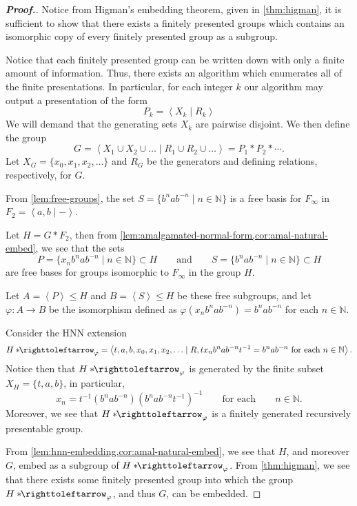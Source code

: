 \documentclass[11pt,a4paper,reqno]{amsart}
\theoremstyle{plain}
\theoremstyle{definition}
\theoremstyle{definition}
\renewcommand\leq\leqslant
\newenvironment{myproof}{\begin{proof}[\normalfont\bfseries Proof.]}{\end{proof}}
\newcommand\hnn{*\!\!\righttoleftarrow}
\begin{document}
\begin{myproof}
	Notice from Higman's embedding theorem, given in \cref{thm:higman}, it is sufficient to show that there exists a finitely presented groups which contains an isomorphic copy of every finitely presented group as a subgroup.

	Notice that each finitely presented group can be written down with only a finite amount of information.
	Thus, there exists an algorithm which enumerates all of the finite presentations.
	In particular, for each integer $k$ our algorithm may output a presentation of the form
	\[
		P_k = \left\langle X_k\mid R_k  \right\rangle
	\]
	We will demand that the generating sets $X_k$ are pairwise disjoint.
	We then define the group
	\[
		G = \left\langle
		X_1 \cup X_2 \cup \ldots
		\mid
		R_1 \cup R_2\cup\ldots
		\right\rangle = P_1 * P_2 * \cdots.
	\]
  Let $X_G = \{x_0,x_1,x_2,\ldots\}$ and $R_G$ be the generators and  defining relations, respectively, for $G$.

	From \cref{lem:free-groups}, the set 
  $
      S = \{b^n a b^{-n} \mid n \in \mathbb N\}
  $
  is a free basis for $F_\infty$ in $F_2 = \left\langle a,b\mid - \right\rangle$.

  Let $H = G * F_2$, then from \cref{lem:amalgamated-normal-form,cor:amal-natural-embed}, we see that the sets
\[
  P = \{ x_n b^n a b^{-n} \mid n\in \mathbb N \}\subset H
  \qquad
  \text{and}
  \qquad
  S = \{ b^n a b^{-n} \mid n\in \mathbb N \}\subset H
\]
are free bases for groups isomorphic to $F_\infty$ in the group $H$.

Let $A = \left\langle P \right\rangle \leq H$ and $B= \left\langle S \right\rangle\leq H$ be these free subgroups, and let $\varphi\colon A\to B$ be the isomorphism defined as
$
  \varphi(x_n b^n a b^{-n}) = b^n a b^{-n}
$
for each $n\in \mathbb N$.

Consider the HNN extension
\[
  H\hnn_\varphi
  =
  \left\langle
    t,a,b,x_0,x_1,x_2,\ldots
  \mid
    R,
    t x_n b^n a b^{-n} t^{-1} = b^n a b^{-n}
  \text{ for each }n\in \mathbb N
  \right\rangle.
\]
Notice then that $H\hnn_\varphi$ is generated by the finite subset $X_H = \{t,a,b\}$, in particular,
\[
  x_n = t^{-1} (b^n a b^{-n}) (b^n a b^{-n} t^{-1})^{-1}
  \qquad
  \text{for each}
  \qquad
  n\in \mathbb N.
\]
Moreover, we see that $H\hnn_\varphi$ is a finitely generated recursively presentable group.

From \cref{lem:hnn-embedding,cor:amal-natural-embed}, we see that $H$, and moreover $G$, embed as a subgroup of $H \hnn_\varphi$.
From \cref{thm:higman}, we see that there exists some finitely presented group into which the group $H\hnn_\varphi$, and thus $G$, can be embedded.
\end{myproof}
\end{document}
